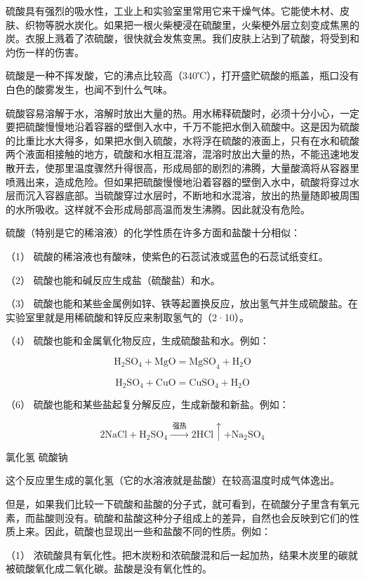 硫酸具有强烈的吸水性，工业上和实验室里常用它来干燥气体。它能使木材、皮肤、织物等脱水炭化。如果把一根火柴梗浸在硫酸里，火柴梗外层立刻变成焦黑的炭。衣服上溅着了浓硫酸，很快就会发焦变黑。我们皮肤上沾到了硫酸，将受到和灼伤一样的伤害。

硫酸是一种不挥发酸，它的沸点比较高（340℃），打开盛贮硫酸的瓶盖，瓶口没有白色的酸雾发生，也闻不到什么气味。

硫酸容易溶解于水，溶解时放出大量的热。用水稀释硫酸时，必须十分小心，一定要把硫酸慢慢地沿着容器的壁倒入水中，千万不能把水倒入硫酸中。这是因为硫酸的比重比水大得多，如果把水倒入硫酸，水将浮在硫酸的液面上，只有在水和硫酸两个液面相接触的地方，硫酸和水相互混溶，混溶时放出大量的热，不能迅速地发散开去，使那里温度骤然升得很高，形成局部的剧烈的沸腾，大量酸滴将从容器里喷溅出来，造成危险。但如果把硫酸慢慢地沿着容器的壁倒入水中，硫酸将穿过水层而沉入容器底部。当硫酸穿过水层时，不断地和水混溶，放出的热量随即被周围的水所吸收。这样就不会形成局部高温而发生沸腾。因此就没有危险。

硫酸（特别是它的稀溶液）的化学性质在许多方面和盐酸十分相似：

（1） 硫酸的稀溶液也有酸味，使紫色的石蕊试液或蓝色的石蕊试纸变红。

（2） 硫酸也能和碱反应生成盐（硫酸盐）和水。

（3）
硫酸也能和某些金属例如锌、铁等起置换反应，放出氢气并生成硫酸盐。在实验室里就是用稀硫酸和锌反应来制取氢气的（2·10）。

（4） 硫酸也能和金属氧化物反应，生成硫酸盐和水。例如：

\[
\mathrm{H}_{2} \mathrm{SO}_{4} + \mathrm{MgO} = \mathrm{MgSO}_{4} + \mathrm{H}_{2} \mathrm{O}
\]

\[
\mathrm{H}_{2} \mathrm{SO}_{4} + \mathrm{CuO} = \mathrm{CuSO}_{4} + \mathrm{H}_{2} \mathrm{O}
\]

（6） 硫酸也能和某些盐起复分解反应，生成新酸和新盐。例如：

\[
2 \mathrm{NaCl} + \mathrm{H}_{2} \mathrm{SO}_{4} \xrightarrow {\text{ 强热 }} 2 \mathrm{HCl} \uparrow + \mathrm{Na}_{2} \mathrm{SO}_{4}
\]

氯化氢 硫酸钠

这个反应里生成的氯化氢（它的水溶液就是盐酸）在较高温度时成气体逸出。

但是，如果我们比较一下硫酸和盐酸的分子式，就可看到，在硫酸分子里含有氧元素，而盐酸则没有。硫酸和盐酸这种分子组成上的差异，自然也会反映到它们的性质上来。因此，硫酸也显现出一些和盐酸不同的性质。例如：

（1）
浓硫酸具有氧化性。把木炭粉和浓硫酸混和后一起加热，结果木炭里的碳就被硫酸氧化成二氧化碳。盐酸是没有氧化性的。

